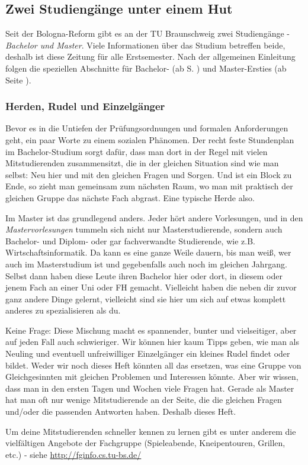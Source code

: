 \subsection{Zwei Studiengänge unter einem Hut}
	Seit der Bologna-Reform gibt es an der TU Braunschweig zwei Studiengänge - \textit{Bachelor und Master}. Viele Informationen über das Studium betreffen beide, deshalb ist diese Zeitung für alle Erstsemester. Nach der allgemeinen Einleitung folgen die speziellen Abschnitte für Bachelor- (ab S. \pageref{bachelor}) und Master-Ersties (ab Seite \pageref{master}).

\subsubsection{Herden, Rudel und Einzelgänger}
	Bevor es in die Untiefen der Prüfungsordnungen und formalen Anforderungen geht, ein paar Worte zu einem sozialen Phänomen. Der recht feste Stundenplan im Bachelor-Studium sorgt dafür, dass man dort in der Regel mit vielen Mitstudierenden zusammensitzt, die in der gleichen Situation sind wie man selbst: Neu hier und mit den gleichen Fragen und Sorgen. Und ist ein Block zu Ende, so zieht man gemeinsam zum nächsten Raum, wo man mit praktisch der gleichen Gruppe das nächste Fach abgrast. Eine typische Herde also.

	Im Master ist das grundlegend anders. Jeder hört andere Vorlesungen, und in den \emph{Mastervorlesungen} tummeln sich nicht nur Masterstudierende, sondern auch Bachelor- und Diplom- oder gar fachverwandte Studierende, wie z.B. Wirtschaftsinformatik. Da kann es eine ganze Weile dauern, bis man weiß, wer auch im Masterstudium ist und gegebenfalls auch noch im gleichen Jahrgang. Selbst dann haben diese Leute ihren Bachelor hier oder dort, in diesem oder jenem Fach an einer Uni oder FH gemacht. Vielleicht haben die neben dir zuvor ganz andere Dinge gelernt, vielleicht sind sie hier um sich auf etwas komplett anderes zu spezialisieren als du.

	Keine Frage: Diese Mischung macht es spannender, bunter und vielseitiger, aber auf jeden Fall auch schwieriger. Wir können hier kaum Tipps geben, wie man als Neuling und eventuell unfreiwilliger Einzelgänger ein kleines Rudel findet oder bildet. Weder wir noch dieses Heft könnten all das ersetzen, was eine Gruppe von Gleichgesinnten mit gleichen Problemen und Interessen könnte. Aber wir wissen, dass man in den ersten Tagen und Wochen viele Fragen hat. Gerade als Master hat man oft nur wenige Mitstudierende an der Seite, die die gleichen Fragen und/oder die passenden Antworten haben. Deshalb dieses Heft.

	Um deine Mitstudierenden schneller kennen zu lernen gibt es unter anderem die vielfältigen Angebote der Fachgruppe (Spieleabende, Kneipentouren, Grillen, etc.) - siehe \url{http://fginfo.cs.tu-bs.de/}
